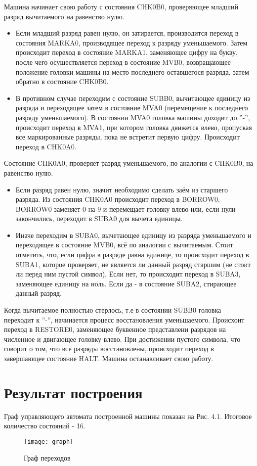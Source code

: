 Машина начинает свою работу с состояния CHK0B0, проверяющее младший разряд вычитаемого на равенство нулю.
\begin{itemize}
\item 
Если младший разряд равен нулю, он затирается, производится переход в состояния MARKA0, производящее переход к разряду уменьшаемого. Затем происходит переход в состояние MARKA1, заменяющее цифру на букву, после чего осуществляется переход в состояние MVB0, возвращающее положение головки машины на место последнего оставшегося разряда, затем обратно в состояние CHK0B0.
\item
В противном случае переходим с состояние SUBB0, вычитающее единицу из разряда и переходящее затем в состояние MVA0 (перемещение к последнего разряду уменьшаемого). В состоянии MVA0 головка машины доходит до ''-'', происходит переход в MVA1, при котором головка движется влево, пропуская все маркированные разряды, пока не встретит первую цифру. Происходит переход в CHK0A0. 
\end{itemize}

Состояние CHK0A0, проверяет разряд уменьшаемого, по аналогии с CHK0B0, на равенство нулю.
\begin{itemize}
\item 
Если разряд равен нулю, значит необходимо сделать заём из старшего разряда. Из состояния CHK0A0 происходит переход в BORROW0. BORROW0 заменяет 0 на 9 и перемещает головку влево или, если нули закончились, переходит в SUBA0 для вычета единицы.
\item
Иначе переходим в SUBA0, вычетающее единицу из разряда уменьшаемого и переходящее в состояние MVB0, всё по аналогии с вычитаемым. Стоит отметить, что, если цифра в разряде равна единице, то происходит переход в SUBA1, которое проверяет, не является ли данный разряд старшим (не стоит ли перед ним пустой символ). Если нет, то происходит переход в SUBA3, заменяющее единицу на ноль. Если да - в состояние SUBA2, стирающее данный разряд.
\end{itemize}

Когда вычитаемое полностью стерлось, т.е в состоянии SUBB0 головка переходит к ''-'', начинается процесс восстановления уменьшаемого. Происхоит переход в RESTORE0, заменяющее буквенное представлени разрядов на численное и двигающее головку влево. При достижении пустого символа, что говорит о том, что все разряды восстановлены, происходит переход в завершающее состояние HALT. Машина останавливает свою работу.

\section{Результат построения}
Граф управляющего автомата построенной машины показан на Рис. 4.1. Итоговое количество состояний - 16.
\begin{figure}[H]
	\begin{center}
		\texttt{[image: graph]}
		\caption{Граф переходов} 
		\label{pic:graph} %
	\end{center}
\end{figure}

